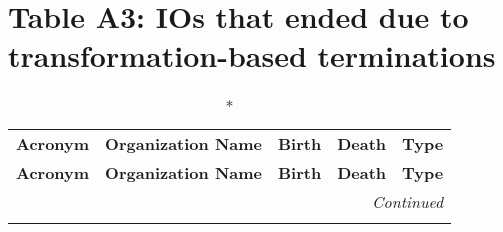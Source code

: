 \documentclass[12pt]{article}
\begin{document}
\newpage
\section*{Table A3: IOs that ended due to transformation-based terminations}

\begin{longtable}{lp{5.5cm}ccc}
\caption*{} \\
\hline
\textbf{Acronym} & \textbf{Organization Name} & \textbf{Birth} & \textbf{Death} & \textbf{Type} \\
\hline
\endfirsthead

\hline
\textbf{Acronym} & \textbf{Organization Name} & \textbf{Birth} & \textbf{Death} & \textbf{Type} \\
\hline
\endhead

\hline
\multicolumn{5}{r}{\textit{Continued}} \\
\endfoot

\hline
\endlastfoot


\end{longtable}
\end{document}
